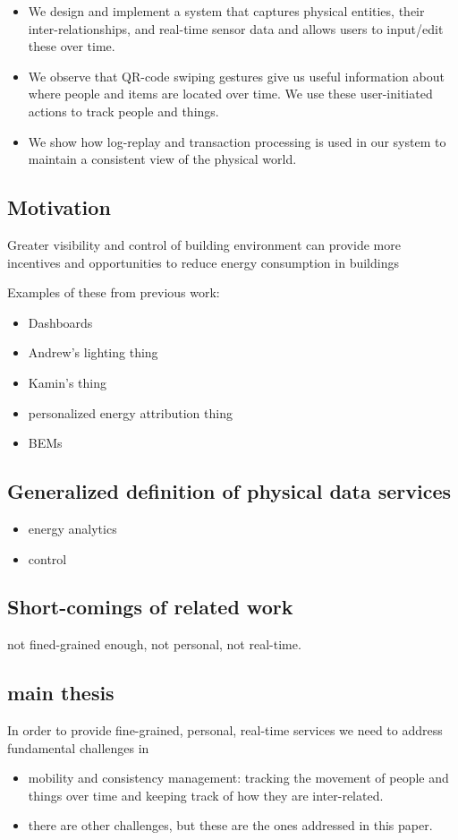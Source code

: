 \begin{itemize}
\item We design and implement a system that captures physical entities, their inter-relationships, and real-time sensor data and 
		allows users to input/edit these over time.
\item We observe that QR-code swiping gestures give us useful information about where people and items are located over time.  We
		use these user-initiated actions to track people and things.
\item We show how log-replay and transaction processing is used in our system to maintain a consistent view of the physical world.
\end{itemize}


\subsection{Motivation} 
Greater visibility and control of building environment can provide more incentives and opportunities to reduce energy consumption in buildings

Examples of these from previous work:
\begin{itemize}
\item Dashboards
\item Andrew’s lighting thing
\item Kamin’s thing
\item personalized energy attribution thing
\item BEMs
\end{itemize}

\subsection{Generalized definition of physical data services}

\begin{itemize}
\item energy analytics
\item control
\end{itemize}

\subsection{Short-comings of related work}
not fined-grained enough, not personal, not real-time.

\subsection{main thesis}  
In order to provide fine-grained, personal, real-time services we need to address fundamental challenges in

\begin{itemize}
\item mobility and consistency management: tracking the movement of people and things over time and keeping track of how they are inter-related.
\item there are other challenges, but these are the ones addressed in this paper.
\end{itemize}